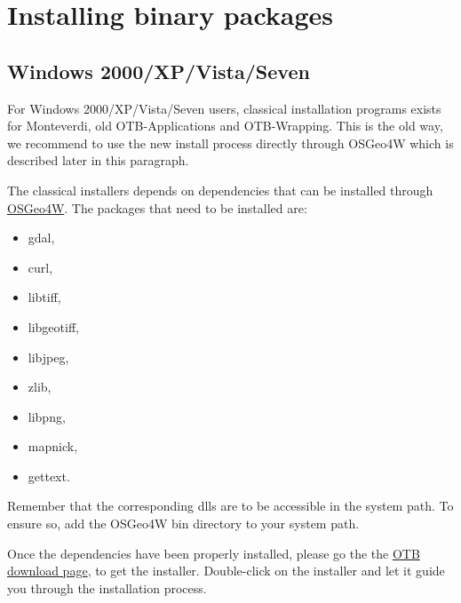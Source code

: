 \section{Installing binary packages}
\label{sec:install_binaries}

\subsection{Windows 2000/XP/Vista/Seven}
\label{ssec:windows_binaries}

For Windows 2000/XP/Vista/Seven users, classical installation programs exists for Monteverdi, 
old OTB-Applications and OTB-Wrapping. This is the old way, we recommend to use the new install
process directly through OSGeo4W which is described later in this paragraph. 

The classical installers depends on dependencies that can be installed through \href{http://trac.osgeo.org/osgeo4w/}{OSGeo4W}. The packages that
need to be installed are:
\begin{itemize}
\item gdal,
\item curl, 
\item libtiff,
\item libgeotiff,
\item libjpeg,
\item zlib, 
\item libpng,
\item mapnick,
\item gettext.
\end{itemize}\label{OSGeo4W_lib}
Remember that the corresponding dlls are to be accessible in the system path. To ensure so, add
the OSGeo4W bin directory to your system path.

Once the dependencies have been properly installed, please go the the 
\href{http://sourceforge.net/projects/orfeo-toolbox/}{OTB download page}, to
get the installer. Double-click on the installer and let it guide you through the 
installation process.

